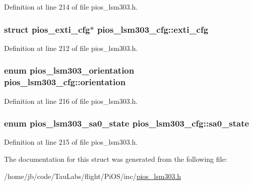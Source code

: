 \-Definition at line 214 of file pios\-\_\-lsm303.\-h.

\hypertarget{structpios__lsm303__cfg_a90c0ca7937453279f276d8adc5b7e82c}{
\subsubsection[{exti\-\_\-cfg}]{\setlength{\rightskip}{0pt plus 5cm}struct {\bf pios\-\_\-exti\-\_\-cfg}$\ast$ {\bf pios\-\_\-lsm303\-\_\-cfg\-::exti\-\_\-cfg}}}\label{structpios__lsm303__cfg_a90c0ca7937453279f276d8adc5b7e82c}


\-Definition at line 212 of file pios\-\_\-lsm303.\-h.

\hypertarget{structpios__lsm303__cfg_a53a64d5c1d513bda3033f35b41a5afcc}{
\subsubsection[{orientation}]{\setlength{\rightskip}{0pt plus 5cm}enum {\bf pios\-\_\-lsm303\-\_\-orientation} {\bf pios\-\_\-lsm303\-\_\-cfg\-::orientation}}}\label{structpios__lsm303__cfg_a53a64d5c1d513bda3033f35b41a5afcc}


\-Definition at line 216 of file pios\-\_\-lsm303.\-h.

\hypertarget{structpios__lsm303__cfg_a14bcbef91027a231f863b4629c9cdc74}{
\subsubsection[{sa0\-\_\-state}]{\setlength{\rightskip}{0pt plus 5cm}enum {\bf pios\-\_\-lsm303\-\_\-sa0\-\_\-state} {\bf pios\-\_\-lsm303\-\_\-cfg\-::sa0\-\_\-state}}}\label{structpios__lsm303__cfg_a14bcbef91027a231f863b4629c9cdc74}


\-Definition at line 215 of file pios\-\_\-lsm303.\-h.



\-The documentation for this struct was generated from the following file\-:\begin{DoxyCompactItemize}
\item 
/home/jb/code/\-Tau\-Labs/flight/\-Pi\-O\-S/inc/\hyperlink{pios__lsm303_8h}{pios\-\_\-lsm303.\-h}\end{DoxyCompactItemize}

